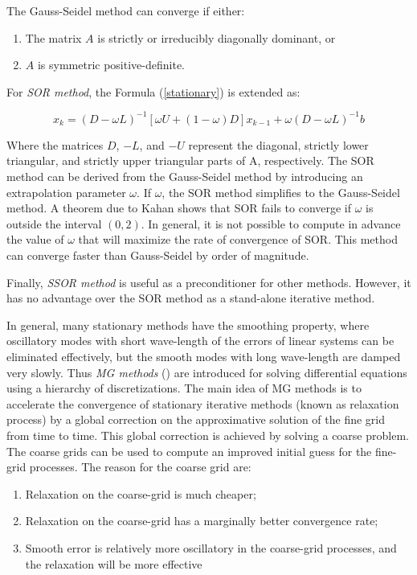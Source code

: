 The Gauss-Seidel method can converge if either:

\begin{enumerate}
	\item The matrix $A$ is strictly or irreducibly diagonally dominant, or
	\item $A$ is symmetric positive-definite.
\end{enumerate}

For \textit{SOR method}, the Formula (\ref{stationary}) is extended as:

\[ x_{k}=(D-\omega L)^{-1}[\omega U+(1-\omega)D]x_{k-1}+\omega(D-\omega L)^{-1}b\]

Where the matrices $D$, $-L$, and $-U$ represent the diagonal, strictly lower triangular, and strictly upper triangular parts of A, respectively. The SOR method can be derived from the Gauss-Seidel method by introducing an extrapolation parameter $\omega$. If $\omega$, the SOR method simplifies to the Gauss-Seidel method. A theorem due to Kahan \cite{kahan1958rate} shows that SOR fails to converge if $\omega$ is outside the interval $(0,2)$. In general, it is not possible to compute in advance the value of $\omega$ that will maximize the rate of convergence of SOR. This method can converge faster than Gauss-Seidel by order of magnitude.

Finally, \textit{SSOR method} is useful as a preconditioner for other methods. However, it has no advantage over the SOR method as a stand-alone iterative method.

In general, many stationary methods have the smoothing property, where oscillatory modes with short wave-length of the errors of linear systems can be eliminated effectively, but the smooth modes with long wave-length are damped very slowly. Thus \textit{MG methods} (\cite{hutchinson1986multigrid, hiptmair1998multigrid, bank1988hierarchical}) are introduced for solving differential equations using a hierarchy of discretizations. The main idea of MG methods is to accelerate the convergence of stationary iterative methods (known as relaxation process) by a global correction on the approximative solution of the fine grid from time to time. This global correction is achieved by solving a coarse problem. The coarse grids can be used to compute an improved initial guess for the fine-grid processes. The reason for the coarse grid are:

\begin{enumerate}
	\item Relaxation on the coarse-grid is much cheaper;
	\item Relaxation on the coarse-grid has a marginally better convergence rate;
	\item Smooth error is relatively more oscillatory in the coarse-grid processes, and the relaxation will be more effective
\end{enumerate}


